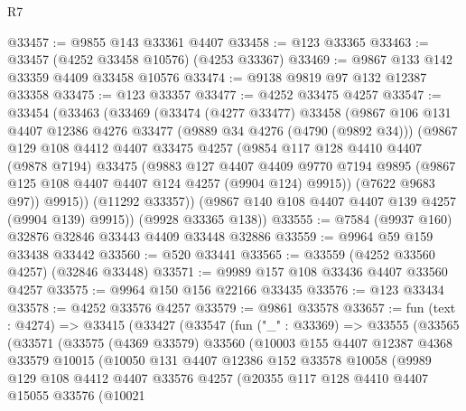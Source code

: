\begin{lexlean}{R7}
\begin{coremodule}
@33457 := @9855 @143 @33361 @4407
@33458 := @123 @33365
@33463 := @33457 (@4252 @33458 @10576) (@4253 @33367)
@33469 := @9867 @133 @142 @33359 @4409 @33458 @10576
@33474 := @9138 @9819 @97 @132 @12387 @33358
@33475 := @123 @33357
@33477 := @4252 @33475 @4257
@33547 := @33454
    (@33463
      (@33469
        (@33474
          (@4277 @33477)
          @33458
          (@9867
            @106
            @131
            @4407
            @12386
            @4276
            @33477
            (@9889 @34 @4276 (@4790 (@9892 @34)))
            (@9867
              @129
              @108
              @4412
              @4407
              @33475
              @4257
              (@9854
                @117
                @128
                @4410
                @4407
                (@9878 @7194)
                @33475
                (@9883
                  @127
                  @4407
                  @4409
                  @9770
                  @7194
                  @9895
                  (@9867 @125 @108 @4407 @4407 @124 @4257 (@9904 @124) @9915))
                (@7622 @9683 @97))
              @9915))
          (@11292 @33357))
        (@9867 @140 @108 @4407 @4407 @139 @4257 (@9904 @139) @9915))
      (@9928 @33365 @138))
@33555 := @7584 (@9937 @160) @32876 @32846 @33443 @4409 @33448 @32886
@33559 := @9964 @59 @159 @33438 @33442
@33560 := @520 @33441
@33565 := @33559 (@4252 @33560 @4257) (@32846 @33448)
@33571 := @9989 @157 @108 @33436 @4407 @33560 @4257
@33575 := @9964 @150 @156 @22166 @33435
@33576 := @123 @33434
@33578 := @4252 @33576 @4257
@33579 := @9861 @33578
@33657 := fun (text : @4274) =>
  @33415
    (@33427
      (@33547
        (fun ("_" : @33369) =>
        @33555
          (@33565
            (@33571
              (@33575
                (@4369 @33579)
                @33560
                (@10003
                  @155
                  @4407
                  @12387
                  @4368
                  @33579
                  @10015
                  (@10050
                    @131
                    @4407
                    @12386
                    @152
                    @33578
                    @10058
                    (@9989
                      @129
                      @108
                      @4412
                      @4407
                      @33576
                      @4257
                      (@20355
                        @117
                        @128
                        @4410
                        @4407
                        @15055
                        @33576
                        (@10021

\end{coremodule}
\end{lexlean}
